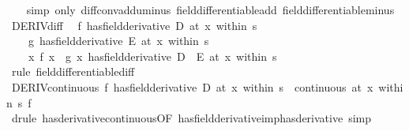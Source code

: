 \begin{isabellebody}
%
\isadelimproof
\ \ %
\endisadelimproof
%
\isatagproof
{}\isamarkupfalse%
\ {\isacharparenleft}{\kern0pt}simp\ only{\isacharcolon}{\kern0pt}\ diff{\isacharunderscore}{\kern0pt}conv{\isacharunderscore}{\kern0pt}add{\isacharunderscore}{\kern0pt}uminus\ field{\isacharunderscore}{\kern0pt}differentiable{\isacharunderscore}{\kern0pt}add\ field{\isacharunderscore}{\kern0pt}differentiable{\isacharunderscore}{\kern0pt}minus{\isacharparenright}{\kern0pt}%
\endisatagproof
{\isafoldproof}%
%
\isadelimproof
\isanewline
%
\endisadelimproof
\isanewline
{}\isamarkupfalse%
\ DERIV{\isacharunderscore}{\kern0pt}diff{\isacharcolon}{\kern0pt}\isanewline
\ \ {\isachardoublequoteopen}{\isacharparenleft}{\kern0pt}f\ has{\isacharunderscore}{\kern0pt}field{\isacharunderscore}{\kern0pt}derivative\ D{\isacharparenright}{\kern0pt}\ {\isacharparenleft}{\kern0pt}at\ x\ within\ s{\isacharparenright}{\kern0pt}\ {\isasymLongrightarrow}\isanewline
\ \ \ \ {\isacharparenleft}{\kern0pt}g\ has{\isacharunderscore}{\kern0pt}field{\isacharunderscore}{\kern0pt}derivative\ E{\isacharparenright}{\kern0pt}\ {\isacharparenleft}{\kern0pt}at\ x\ within\ s{\isacharparenright}{\kern0pt}\ {\isasymLongrightarrow}\isanewline
\ \ \ \ {\isacharparenleft}{\kern0pt}{\isacharparenleft}{\kern0pt}{\isasymlambda}x{\isachardot}{\kern0pt}\ f\ x\ {\isacharminus}{\kern0pt}\ g\ x{\isacharparenright}{\kern0pt}\ has{\isacharunderscore}{\kern0pt}field{\isacharunderscore}{\kern0pt}derivative\ D\ {\isacharminus}{\kern0pt}\ E{\isacharparenright}{\kern0pt}\ {\isacharparenleft}{\kern0pt}at\ x\ within\ s{\isacharparenright}{\kern0pt}{\isachardoublequoteclose}\isanewline
%
\isadelimproof
\ \ %
\endisadelimproof
%
\isatagproof
{}\isamarkupfalse%
\ {\isacharparenleft}{\kern0pt}rule\ field{\isacharunderscore}{\kern0pt}differentiable{\isacharunderscore}{\kern0pt}diff{\isacharparenright}{\kern0pt}%
\endisatagproof
{\isafoldproof}%
%
\isadelimproof
\isanewline
%
\endisadelimproof
\isanewline
{}\isamarkupfalse%
\ DERIV{\isacharunderscore}{\kern0pt}continuous{\isacharcolon}{\kern0pt}\ {\isachardoublequoteopen}{\isacharparenleft}{\kern0pt}f\ has{\isacharunderscore}{\kern0pt}field{\isacharunderscore}{\kern0pt}derivative\ D{\isacharparenright}{\kern0pt}\ {\isacharparenleft}{\kern0pt}at\ x\ within\ s{\isacharparenright}{\kern0pt}\ {\isasymLongrightarrow}\ continuous\ {\isacharparenleft}{\kern0pt}at\ x\ within\ s{\isacharparenright}{\kern0pt}\ f{\isachardoublequoteclose}\isanewline
%
\isadelimproof
\ \ %
\endisadelimproof
%
\isatagproof
{}\isamarkupfalse%
\ {\isacharparenleft}{\kern0pt}drule\ has{\isacharunderscore}{\kern0pt}derivative{\isacharunderscore}{\kern0pt}continuous{\isacharbrackleft}{\kern0pt}OF\ has{\isacharunderscore}{\kern0pt}field{\isacharunderscore}{\kern0pt}derivative{\isacharunderscore}{\kern0pt}imp{\isacharunderscore}{\kern0pt}has{\isacharunderscore}{\kern0pt}derivative{\isacharbrackright}{\kern0pt}{\isacharparenright}{\kern0pt}\ simp%

\end{isabellebody}
